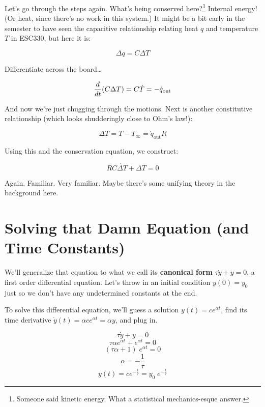 \documentclass{report}
\begin{document}
\begin{onehalfspacing}
\begin{flushleft}
\medskip

Let's go through the steps again. What's being conserved here?\footnote{Someone said kinetic energy. What a statistical mechanics-esque answer.} Internal energy! (Or heat, since there's no work in this system.) It might be a bit early in the semester to have seen the capacitive relationship relating heat \(q\) and temperature \(T\) in ESC330, but here it is:

\vspace{-0.1in}
\[\Delta q = C \Delta T\]

Differentiate across the board\dots

\vspace{-0.1in}
\[\frac{d}{dt} \qty(C \Delta T) = C\dot{T} = -\dot{q}_\text{out}\]

And now we're just chugging through the motions. Next is another constitutive relationship (which looks shudderingly close to Ohm's law!):

\vspace{-0.1in}
\[\Delta T = T - T_\infty = \dot{q}_\text{out} R\]

Using this and the conservation equation, we construct:

\vspace{-0.1in}
\[\boxed{RC \dot{\Delta T} + \Delta T = 0}\]

Again. Familiar. Very familiar. Maybe there's some unifying theory in the background here.

\section{Solving that Damn Equation (and Time Constants)}

We'll generalize that equation to what we call its \textbf{canonical form} \(\tau \dot{y} + y = 0\), a first order differential equation. Let's throw in an initial condition \(y(0)=y_0\) just so we don't have any undetermined constants at the end.

\medskip

To solve this differential equation, we'll guess a solution \(y(t) = ce^{\alpha t}\), find its time derivative \(\dot{y}(t) = \alpha ce^{\alpha t} = \alpha y\), and plug in.

\vspace{-0.1in}
\[\tau \dot{y} + y = 0\]
\[\tau \alpha e^{\alpha t} + e^{\alpha t} = 0\]
\[(\tau \alpha + 1) \; e^{\alpha t} = 0\]
\[\alpha = -\frac{1}{\tau}\]
\[y(t) = ce^{-\frac{t}{\tau}} = y_0 \; e^{-\frac{t}{\tau}}\]


\end{flushleft}
\end{onehalfspacing}
\end{document}
